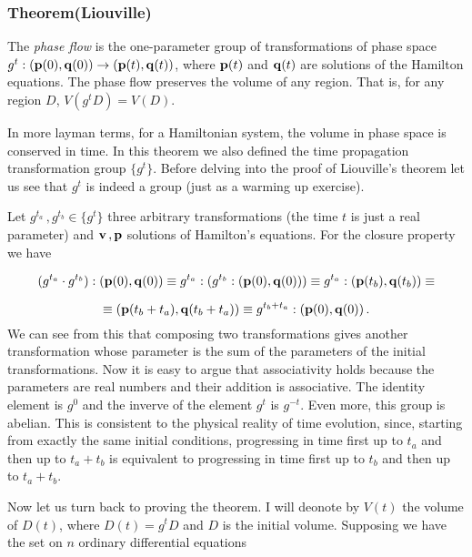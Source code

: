 \documentclass[12pt, class=report, crop=false]{standalone}
\begin{document}
\subsubsection{Theorem(Liouville)}
  The \textit{phase flow} is the one-parameter group of transformations of phase space
  \(g^t:(\vb{p}(0),\vb{q}(0))\rightarrow(\vb{p}(t),\vb{q}(t))\), where \(\vb{p}(t)\) and \(\vb{q}(t)\) are solutions of the Hamilton equations. The phase flow preserves the volume of any region. That is, for any region \(D\), \(V(g^tD)=V(D)\).
\newline

In more layman terms, for a Hamiltonian system, the volume in phase space is conserved in time. In this theorem we also defined the time propagation transformation group \(\{g^t\}\). Before delving into the proof of Liouville's theorem let us see that \({g^t}\) is indeed a group (just as a warming up exercise).

Let \(g^{t_a}\,,g^{t_b}\in \{g^t\}\) three arbitrary transformations (the time \(t\) is just a real parameter) and \(\vb{v}\,,\vb{p}\) solutions of Hamilton's equations. For the closure property we have

\begin{equation*}
  (g^{t_a}\cdot g^{t_b}):(\vb{p}(0),\vb{q}(0)) \equiv g^{t_a}:(g^{t_b}:(\vb{p}(0),\vb{q}(0))) \equiv g^{t_a}:(\vb{p}(t_b),\vb{q}(t_b)) \equiv
\end{equation*}

\begin{equation*}
  \equiv (\vb{p}(t_b+t_a),\vb{q}(t_b+t_a)) \equiv g^{t_b+t_a}:(\vb{p}(0),\vb{q}(0))\,.
\end{equation*}
We can see from this that composing two transformations gives another transformation whose parameter is the sum of the parameters of the initial transformations. Now it is easy to argue that associativity holds because the parameters are real numbers and their addition is associative. The identity element is \(g^0\) and the inverve of the element \(g^t\) is \(g^{-t}\). Even more, this group is abelian. This is consistent to the physical reality of time evolution, since, starting from exactly the same initial conditions, progressing in time first up to \(t_a\) and then up to \(t_a+t_b\) is equivalent to progressing in time first up to \(t_b\) and then up to \(t_a+t_b\).

Now let us turn back to proving the theorem. I will deonote by \(V(t)\) the volume of \(D(t)\), where \(D(t) = g^t D\) and \(D\) is the initial volume. Supposing we have the set on \(n\) ordinary differential equations
\end{document}
